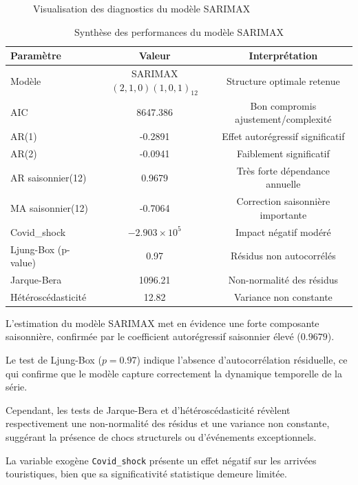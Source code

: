 \documentclass[12pt,a4paper]{report}
\begin{document}
\begin{itemize}[leftmargin=1.5em]
\begin{figure}[H]
\caption{Visualisation des diagnostics du modèle SARIMAX}
\end{figure}
\begin{table}[H]
\centering
\caption{Résultats du meilleur modèle SARIMAX}
\small
\renewcommand{\arraystretch}{1.3}
\begin{tabular}{lcc}
\toprule
\textbf{Paramètre} & \textbf{Valeur} & \textbf{Interprétation} \\
\midrule
Modèle & SARIMAX$(2,1,0)(1,0,1)_{12}$ & Structure optimale retenue \\
AIC & 8647.386 & Bon compromis ajustement/complexité \\
AR(1) & -0.2891 & Effet autorégressif significatif \\
AR(2) & -0.0941 & Faiblement significatif \\
AR saisonnier(12) & 0.9679 & Très forte dépendance annuelle \\
MA saisonnier(12) & -0.7064 & Correction saisonnière importante \\
Covid\_shock & $-2.903\times10^5$ & Impact négatif modéré \\
Ljung-Box (p-value) & 0.97 & Résidus non autocorrélés \\
Jarque-Bera & 1096.21 & Non-normalité des résidus \\
Hétéroscédasticité & 12.82 & Variance non constante \\
\bottomrule
\end{tabular}
\caption{Synthèse des performances du modèle SARIMAX}
\end{table}

L’estimation du modèle SARIMAX met en évidence une forte
composante saisonnière, confirmée par le coefficient
autorégressif saisonnier élevé ($0.9679$).

Le test de Ljung-Box ($p=0.97$) indique l’absence
d’autocorrélation résiduelle, ce qui confirme que le modèle
capture correctement la dynamique temporelle de la série.

Cependant, les tests de Jarque-Bera et d’hétéroscédasticité
révèlent respectivement une non-normalité des résidus et
une variance non constante, suggérant la présence de chocs
structurels ou d’événements exceptionnels.

La variable exogène \texttt{Covid\_shock} présente un effet
négatif sur les arrivées touristiques, bien que sa
significativité statistique demeure limitée.

\end{itemize}
\end{document}
